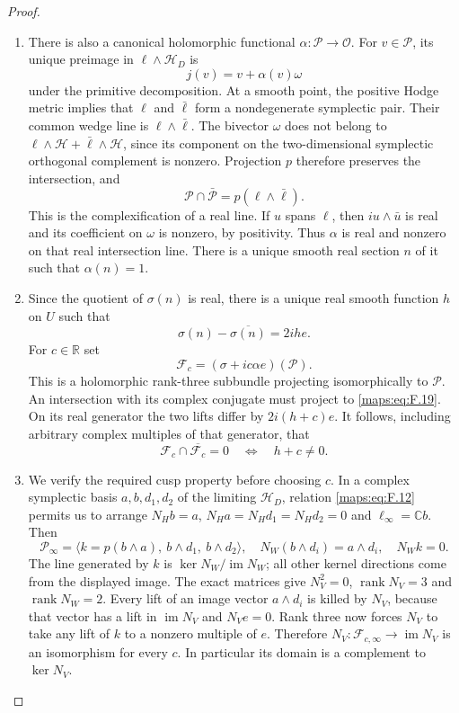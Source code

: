 \begin{proof}
\begin{enumerate}[label=\arabic*.]
\item There is also a canonical holomorphic functional
$\alpha:\mathcal P\to\mathcal O$.
For $v\in\mathcal P$, its unique preimage in
$\ell\wedge\mathcal H_D$ is
\[
 j(v)=v+\alpha(v)\omega
 \tag{F.18}\label{maps:eq:F.18}
\]
under the primitive decomposition.
At a smooth point, the positive Hodge metric implies that
$\ell$ and $\bar\ell$ form a nondegenerate symplectic pair.
Their common wedge line is $\ell\wedge\bar\ell$.
The bivector $\omega$ does not belong to
$\ell\wedge\mathcal H+\bar\ell\wedge\mathcal H$, since its
component on the two-dimensional symplectic orthogonal complement
is nonzero.  Projection $p$ therefore preserves the intersection,
and
\[
 \mathcal P\cap\bar{\mathcal P}
      =p(\ell\wedge\bar\ell).
 \tag{F.19}\label{maps:eq:F.19}
\]
This is the complexification of a real line.  If $u$ spans
$\ell$, then $i u\wedge\bar u$ is real and its coefficient on
$\omega$ is nonzero, by positivity.  Thus $\alpha$ is real and
nonzero on that real intersection line.  There is a unique smooth
real section $n$ of it such that $\alpha(n)=1$.

\item Since the quotient of $\sigma(n)$ is real, there is a unique
real smooth function $h$ on $U$ such that
\[
 \sigma(n)-\overline{\sigma(n)}=2ih e.
 \tag{F.20}\label{maps:eq:F.20}
\]
For $c\in\mathbb R$ set
\[
 \mathcal F_c=(\sigma+ic\alpha e)(\mathcal P).
 \tag{F.21}\label{maps:eq:F.21}
\]
This is a holomorphic rank-three subbundle projecting
isomorphically to $\mathcal P$.  An intersection with its complex
conjugate must project to \eqref{maps:eq:F.19}.  On its real generator the two
lifts differ by $2i(h+c)e$.  It follows, including arbitrary
complex multiples of that generator, that
\[
 \mathcal F_c\cap\overline{\mathcal F_c}=0
       \quad\Longleftrightarrow\quad h+c\ne0.
 \tag{F.22}\label{maps:eq:F.22}
\]

\item We verify the required cusp property before choosing $c$.
In a complex symplectic basis $a,b,d_1,d_2$ of the limiting
$\mathcal H_D$, relation \eqref{maps:eq:F.12} permits us to arrange
$N_Hb=a$, $N_Ha=N_Hd_1=N_Hd_2=0$ and $\ell_\infty=\mathbb Cb$.
Then
\[
 \mathcal P_\infty=
 \langle k=p(b\wedge a),\ b\wedge d_1,\ b\wedge d_2\rangle,
 \quad
 N_W(b\wedge d_i)=a\wedge d_i,
 \quad N_Wk=0.
 \tag{F.23}\label{maps:eq:F.23}
\]
The line generated by $k$ is
$\ker N_W/\operatorname{im}N_W$; all other kernel directions
come from the displayed image.  The exact matrices give
$N_V^2=0$, $\operatorname{rank}N_V=3$ and
$\operatorname{rank}N_W=2$.
Every lift of an image vector $a\wedge d_i$ is killed by $N_V$,
because that vector has a lift in $\operatorname{im}N_V$ and
$N_Ve=0$.  Rank three now forces $N_V$ to take any lift of $k$
to a nonzero multiple of $e$.  Therefore
$N_V:\mathcal F_{c,\infty}\to\operatorname{im}N_V$ is an
isomorphism for every $c$.  In particular its domain is a
complement to $\ker N_V$.


\end{enumerate}
\end{proof}
